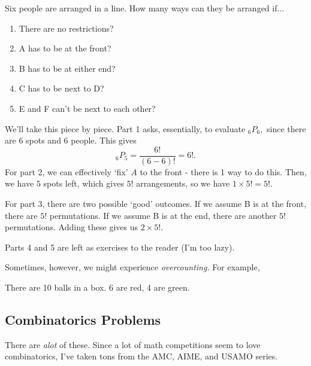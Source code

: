 \documentclass[11pt]{article}
\begin{document}
\begin{example}
    Six people are arranged in a line. How many ways can they be arranged if...
    \begin{enumerate}[noitemsep, topsep = 1pt]
        \item There are no restrictions?
        \item A has to be at the front?
        \item B has to be at either end?
        \item C has to be next to D?
        \item E and F can't be next to each other?
    \end{enumerate}
\end{example}
\begin{solution}
    We'll take this piece by piece. Part 1 asks, essentially, to evaluate $_{6}P_{6},$ since there are $6$ spots and $6$ people. This gives
    \[_{6}P_{5} = \frac{6!}{(6-6)!} = \boxed{6!}.\]
    For part 2, we can effectively `fix' $A$ to the front - there is 1 way to do this. Then, we have $5$ spots left, which gives $5!$ arrangements, so we have $1 \times 5! = \boxed{5!}$.
    
    For part 3, there are two possible `good' outcomes. If we assume B is at the front, there are $5!$ permutations. If we assume B is at the end, there are another $5!$ permutations. Adding these gives us $\boxed{2 \times 5!}.$
    
    Parts 4 and 5 are left as exercises to the reader (I'm too lazy).
\end{solution}

Sometimes, however, we might experience \textit{overcounting.} For example,

\begin{example}
    There are 10 balls in a box. 6 are red, 4 are green. 
\end{example}

\subsection*{Combinatorics Problems}
There are \textit{alot} of these. Since a lot of math competitions seem to love combinatorics, I've taken tons from the AMC, AIME, and USAMO series.
\end{document}
